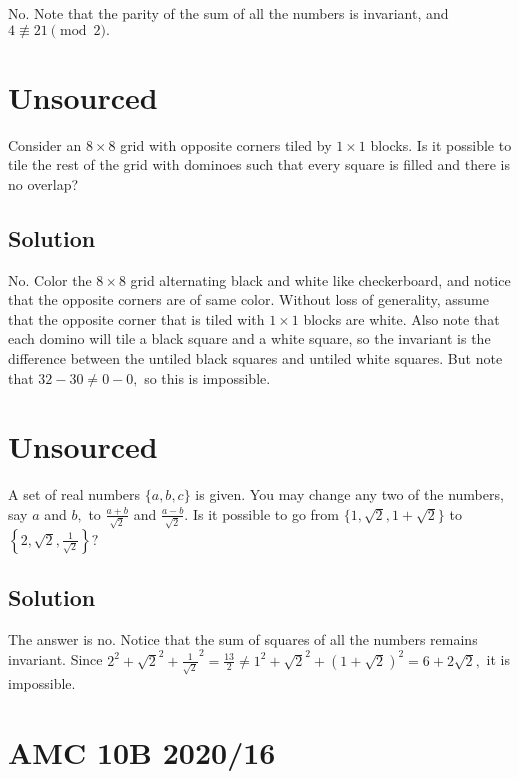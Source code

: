 \documentclass[mast]{lucky}
\begin{document}
No. Note that the parity of the sum of all the numbers is invariant, and $4\not\equiv21\pmod{2}.$

\pagebreak\section{Unsourced}

Consider an $8\times 8$ grid with opposite corners tiled by $1\times 1$ blocks. Is it possible to tile the rest of the grid with dominoes such that every square is filled and there is no overlap?

\subsection{Solution}

No. Color the $8\times 8$ grid alternating black and white like checkerboard, and notice that the opposite corners are of same color. Without loss of generality, assume that the opposite corner that is tiled with $1\times 1$ blocks are white. Also note that each domino will tile a black square and a white square, so the invariant is the difference between the untiled black squares and untiled white squares. But note that $32-30\neq 0-0,$ so this is impossible.

\pagebreak\section{Unsourced}

A set of real numbers $\{a, b, c\}$ is given. You may change any two of the numbers, say $a$ and $b,$ to $\frac{a+b}{\sqrt{2}}$ and $\frac{a-b}{\sqrt{2}} .$ Is it possible to go from $\{1, \sqrt{2}, 1+\sqrt{2}\}$ to $\left\{2, \sqrt{2}, \frac{1}{\sqrt{2}}\right\} ?$

\subsection{Solution}

The answer is no. Notice that the sum of squares of all the numbers remains invariant. Since $2^2+ \sqrt{2}^2 + \frac{1}{\sqrt{2}}^2 = \frac{13}{2} \neq 1^2 + \sqrt{2}^2 + \left(1+\sqrt{2}\right)^2 = 6+2\sqrt{2},$ it is impossible.

\pagebreak\section{AMC 10B 2020/16}
\end{document}
